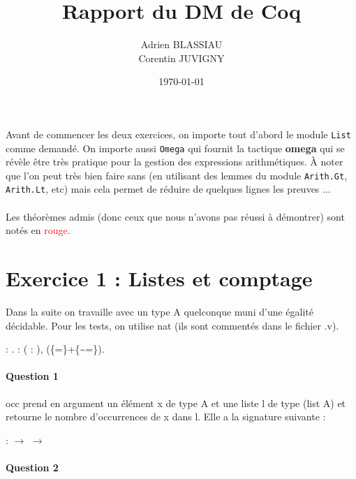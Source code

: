 \documentclass{report}
\title{Rapport du DM de Coq}
\author{Adrien BLASSIAU\\Corentin JUVIGNY}
\date{\today}
\begin{document}
\maketitle

Avant de commencer les deux exercices, on importe tout d'abord le module \texttt{List} comme demandé. On importe aussi \texttt{Omega} qui fournit la tactique \textbf{omega} qui se révèle être très pratique pour la gestion des expressions arithmétiques. À noter que l'on peut très bien faire sans (en utilisant des lemmes du module \texttt{Arith.Gt}, \texttt{Arith.Lt}, etc) mais cela permet de réduire de quelques lignes les preuves ...\\\\
\noindent Les théorèmes admis (donc ceux que nous n'avons pas réussi à démontrer) sont notés en \textcolor{red}{rouge}.

\section{Exercice 1 : Listes et comptage}

Dans la suite on travaille avec un type A quelconque muni d’une égalité décidable. Pour les tests, on utilise nat (ils sont commentés dans le fichier .v).
\begin{coqdoccode}
\coqdocemptyline
\coqdocnoindent
{}  : .\coqdoceol
\coqdocemptyline
\coqdocnoindent
{}  : \coqdockw{\ensuremath{\forall}} (  : ), (\{=\}+\{\~{}=\}).\coqdoceol
\coqdocemptyline
\end{coqdoccode}

\paragraph{Question 1}

occ prend en argument un élément x de type A et une liste l de type (list A) et retourne le nombre d’occurrences de x dans l. Elle a la signature suivante :

\noindent
\noindent\begin{coqdoccode}
\coqdocemptyline
\coqdocnoindent
{} :
 \ensuremath{\rightarrow}
  \ensuremath{\rightarrow} 
\coqdocemptyline
\end{coqdoccode}

\paragraph{Question 2}
\end{document}
